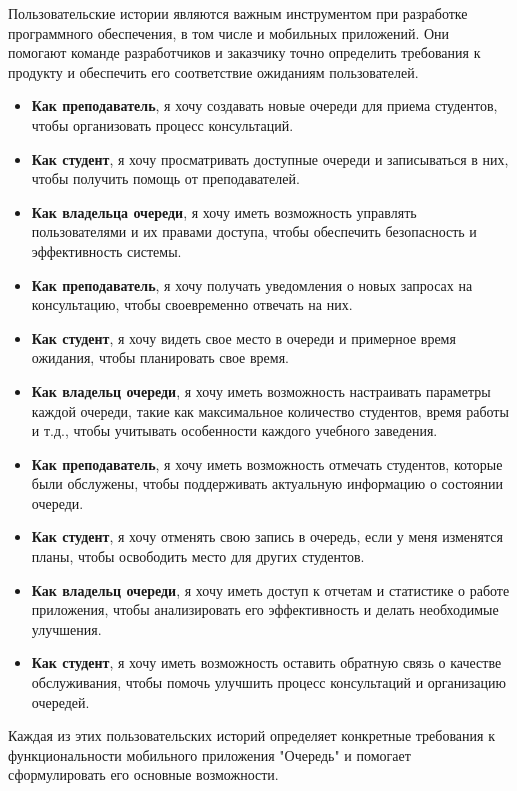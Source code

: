 Пользовательские истории являются важным инструментом
при разработке программного обеспечения, в том числе и мобильных приложений.
Они помогают команде разработчиков и заказчику точно определить требования
к продукту и обеспечить его соответствие ожиданиям пользователей.

\begin{itemize}
	\item \textbf{Как преподаватель}, я хочу создавать новые очереди
		для приема студентов, чтобы организовать процесс консультаций.
	\item \textbf{Как студент}, я хочу просматривать доступные очереди
		и записываться в них, чтобы получить помощь от преподавателей.
	\item \textbf{Как владельца очереди}, я хочу иметь возможность управлять
		пользователями и их правами доступа, чтобы обеспечить безопасность
		и эффективность системы.
	\item \textbf{Как преподаватель}, я хочу получать уведомления
		о новых запросах на консультацию, чтобы своевременно отвечать на них.
	\item \textbf{Как студент}, я хочу видеть свое место в очереди
		и примерное время ожидания, чтобы планировать свое время.
	\item \textbf{Как владельц очереди}, я хочу иметь возможность настраивать
		параметры каждой очереди, такие как максимальное количество студентов,
		время работы и т.д.,
		чтобы учитывать особенности каждого учебного заведения.
	\item \textbf{Как преподаватель}, я хочу иметь возможность отмечать
		студентов, которые были обслужены,
		чтобы поддерживать актуальную информацию о состоянии очереди.
	\item \textbf{Как студент}, я хочу отменять свою запись в очередь,
		если у меня изменятся планы,
		чтобы освободить место для других студентов.
	\item \textbf{Как владельц очереди}, я хочу иметь доступ к отчетам
		и статистике о работе приложения,
		чтобы анализировать его эффективность и делать необходимые улучшения.
	\item \textbf{Как студент}, я хочу иметь возможность оставить обратную
		связь о качестве обслуживания,
		чтобы помочь улучшить процесс консультаций и организацию очередей.
\end{itemize}

Каждая из этих пользовательских историй определяет конкретные требования
к функциональности мобильного приложения "Очередь"
и помогает сформулировать его основные возможности.

